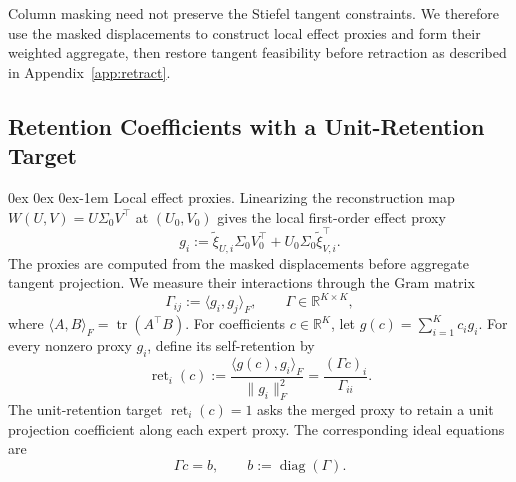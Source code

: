 \documentclass[11pt, a4paper]{utda}
\makeatletter
\renewcommand{\paragraph}{%
  \@startsection{paragraph}{4}%
  {\z@}{0ex \@plus 0ex \@minus 0ex}{-1em}%
  {\normalfont\normalsize\bfseries}%
}
\theoremstyle{plain}
\theoremstyle{definition}
\theoremstyle{remark}
\makeatother
\begin{document}
Column masking need not preserve the Stiefel tangent constraints.
We therefore use the masked displacements to construct local effect
proxies and form their weighted aggregate, then restore tangent
feasibility before retraction as described in Appendix~\ref{app:retract}.

\subsection{Retention Coefficients with a Unit-Retention Target}
\label{app:iso_merger_retention}

\paragraph{Local effect proxies.}
Linearizing the reconstruction map $W(U,V)=U\Sigma_0V^\top$ at
$(U_0,V_0)$ gives the local first-order effect proxy
\begin{equation}
\label{eq:app_iso_merger_effect_proxy}
    g_i
    :=\widetilde\xi_{U,i}\Sigma_0V_0^\top
      +U_0\Sigma_0\widetilde\xi_{V,i}^\top.
\end{equation}
The proxies are computed from the masked displacements before
aggregate tangent projection.
We measure their interactions through the Gram matrix
\begin{equation}
\label{eq:iso_merger_gram}
    \Gamma_{ij}:=\langle g_i,g_j\rangle_F,
    \qquad \Gamma\in\mathbb R^{K\times K},
\end{equation}
where $\langle A,B\rangle_F=\operatorname{tr}(A^\top B)$.
For coefficients $c\in\mathbb R^K$, let
$g(c)=\sum_{i=1}^K c_i g_i$.
For every nonzero proxy $g_i$, define its self-retention by
\begin{equation}
\label{eq:iso_merger_retention}
    \operatorname{ret}_i(c)
    :=\frac{\langle g(c),g_i\rangle_F}{\|g_i\|_F^2}
    =\frac{(\Gamma c)_i}{\Gamma_{ii}}.
\end{equation}
The unit-retention target $\operatorname{ret}_i(c)=1$ asks the
merged proxy to retain a unit projection coefficient along each
expert proxy. The corresponding ideal equations are
\begin{equation}
\label{eq:app_iso_merger_ideal_system}
    \Gamma c=b,
    \qquad b:=\operatorname{diag}(\Gamma).
\end{equation}
\end{document}
